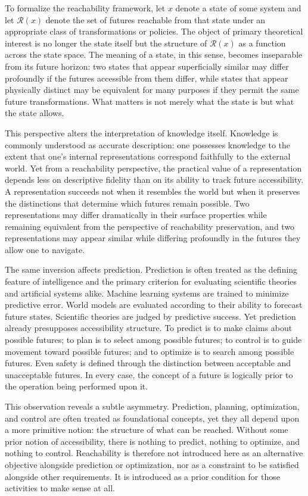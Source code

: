 \documentclass[12pt,a4paper]{article}
\theoremstyle{plain}
\theoremstyle{definition}
\theoremstyle{remark}
\begin{document}
To formalize the reachability framework, let $x$ denote a state of some
system and let $\mathcal{R}(x)$ denote the set of futures reachable from
that state under an appropriate class of transformations or policies. The
object of primary theoretical interest is no longer the state itself but the
structure of $\mathcal{R}(x)$ as a function across the state space. The
meaning of a state, in this sense, becomes inseparable from its future
horizon: two states that appear superficially similar may differ profoundly
if the futures accessible from them differ, while states that appear
physically distinct may be equivalent for many purposes if they permit the
same future transformations. What matters is not merely what the state is
but what the state allows.

This perspective alters the interpretation of knowledge itself. Knowledge is
commonly understood as accurate description: one possesses knowledge to the
extent that one's internal representations correspond faithfully to the
external world. Yet from a reachability perspective, the practical value of a
representation depends less on descriptive fidelity than on its ability to
track future accessibility. A representation succeeds not when it resembles
the world but when it preserves the distinctions that determine which futures
remain possible. Two representations may differ dramatically in their surface
properties while remaining equivalent from the perspective of reachability
preservation, and two representations may appear similar while differing
profoundly in the futures they allow one to navigate.

The same inversion affects prediction. Prediction is often treated as the
defining feature of intelligence and the primary criterion for evaluating
scientific theories and artificial systems alike. Machine learning systems
are trained to minimize predictive error. World models are evaluated
according to their ability to forecast future states. Scientific theories are
judged by predictive success. Yet prediction already presupposes accessibility
structure. To predict is to make claims about possible futures; to plan is to
select among possible futures; to control is to guide movement toward possible
futures; and to optimize is to search among possible futures. Even safety is
defined through the distinction between acceptable and unacceptable futures.
In every case, the concept of a future is logically prior to the operation
being performed upon it.

This observation reveals a subtle asymmetry. Prediction, planning,
optimization, and control are often treated as foundational concepts, yet
they all depend upon a more primitive notion: the structure of what can be
reached. Without some prior notion of accessibility, there is nothing to
predict, nothing to optimize, and nothing to control. Reachability is
therefore not introduced here as an alternative objective alongside prediction
or optimization, nor as a constraint to be satisfied alongside other
requirements. It is introduced as a prior condition for those activities to
make sense at all.
\end{document}
